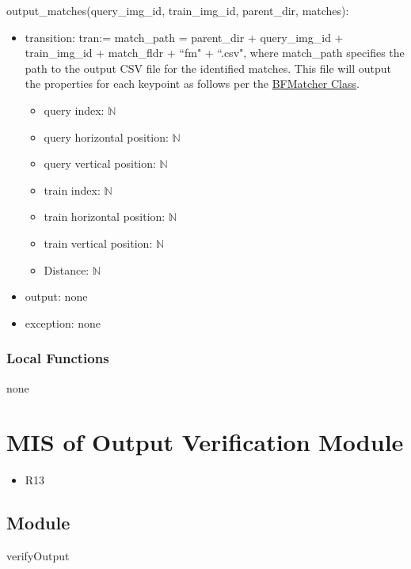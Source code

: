 \documentclass[12pt, titlepage]{article}
\begin{document}
  
  \noindent output\_matches(query\_img\_id, train\_img\_id, parent\_dir, matches):
  \begin{itemize}
    \item transition: tran:= match\_path = parent\_dir + query\_img\_id + train\_img\_id + match\_fldr + ``fm" + ``.csv", 
    where match\_path specifies the path to the output CSV file for the identified matches. 
    This file will output the properties for each keypoint as 
    follows per the \href{https://docs.opencv.org/3.4/d3/da1/classcv_1_1BFMatcher.html}{BFMatcher Class}.
    \begin{itemize}
      \item query index: $\mathbb{N}$
      \item query horizontal position: $\mathbb{N}$
      \item query vertical position: $\mathbb{N}$
      \item train index: $\mathbb{N}$
      \item train horizontal position: $\mathbb{N}$
      \item train vertical position: $\mathbb{N}$
      \item Distance: $\mathbb{N}$
    \end{itemize}
    \item output: none
    \item exception: none
  \end{itemize}


\subsubsection{Local Functions}
none

\section{MIS of Output Verification Module} \label{mOV}
\begin{itemize}
  \item R13
\end{itemize}
\subsection{Module}

verifyOutput
\end{document}
